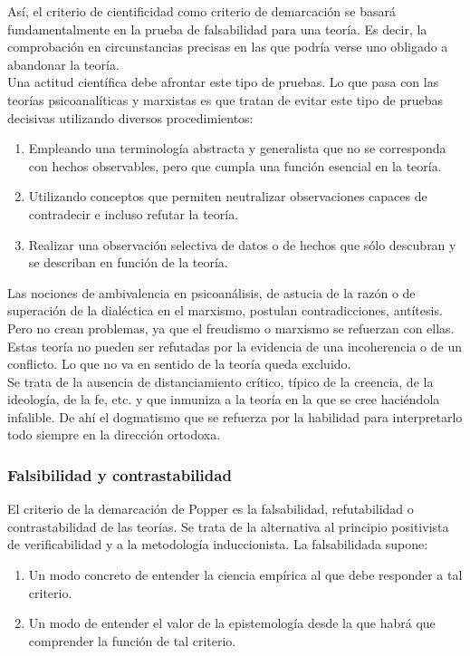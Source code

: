 \documentclass[a4paper, 11pt, twocolumn, spanish]{article}
\begin{document}
Así, el criterio de cientificidad como criterio de demarcación se
basará fundamentalmente en la prueba de falsabilidad para una
teoría. Es decir, la comprobación en circunstancias precisas en las
que podría verse uno obligado a abandonar la teoría.\\[0pt]
Una actitud científica debe afrontar este tipo de pruebas. Lo que pasa
con las teorías psicoanalíticas y marxistas es que tratan de evitar
este tipo de pruebas decisivas utilizando diversos procedimientos:
\begin{enumerate}
\item Empleando una terminología abstracta y generalista que no se
corresponda con hechos observables, pero que cumpla una función
esencial en la teoría.
\item Utilizando conceptos que permiten neutralizar observaciones
capaces de contradecir e incluso refutar la teoría.
\item Realizar una observación selectiva de datos o de hechos que sólo
descubran y se describan en función de la teoría.
\end{enumerate}

Las nociones de ambivalencia en psicoanálisis, de astucia de la razón
o de superación de la dialéctica en el marxismo, postulan
contradicciones, antítesis. Pero no crean problemas, ya que el
freudismo o marxismo se refuerzan con ellas. Estas teoría no pueden
ser refutadas por la evidencia de una incoherencia o de un
conflicto. Lo que no va en sentido de la teoría queda excluido.\\[0pt]
Se trata de la ausencia de distanciamiento crítico, típico de la
creencia, de la ideología, de la fe, etc. y que inmuniza a la teoría
en la que se cree haciéndola infalible. De ahí el dogmatismo que se
refuerza por la habilidad para interpretarlo todo siempre en la
dirección ortodoxa.

\subsubsection{Falsibilidad y contrastabilidad}
\label{sec:org02bee55}
El criterio de la demarcación de Popper es la falsabilidad,
refutabilidad o contrastabilidad de las teorías. Se trata de la
alternativa al principio positivista de verificabilidad y a la
metodología induccionista. La falsabilidada supone:
\begin{enumerate}
\item Un modo concreto de entender la ciencia empírica al que debe
responder a tal criterio.
\item Un modo de entender el valor de la epistemología desde la que
habrá que comprender la función de tal criterio.
\end{enumerate}
\end{document}
